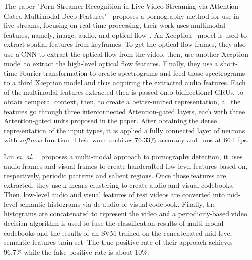 The paper "Porn Streamer Recognition in Live Video Streaming via Attention-Gated Multimodal Deep Features"~\cite{wang2019porn} proposes a pornography method for use in live streams, focusing on real-time processing, their work uses multimodal features, namely, image, audio, and optical flow~\cite{horn1981opticalflow}. 
An Xception~\cite{chollet2017xception} model is used to extract spatial features from keyframes. 
To get the optical flow frames, they also use a CNN to extract the optical flow from the video, then, use another Xception model to extract the high-level optical flow features. 
Finally, they use a short-time Fourier transformation to create spectrograms and feed those spectrograms to a third Xception model and thus acquiring the extracted audio features.  
Each of the multimodal features extracted then is passed onto bidirectional GRUs\cite{dey2017GRU}, to obtain temporal context, then, to create a better-unified representation, all the features go through three interconnected Attention-gated layers, each with three Attention-gated units proposed in the paper. After obtaining the dense representation of the input types, it is applied a fully connected layer of neurons with \textit{softmax} function. Their work archives 76.33\% accuracy and runs at 66.1 fps.

Liu \textit{et. al.} ~\cite{liu2020analyzing} proposes a multi-modal approach to pornography detection, it uses audio-frames and visual-frames to create handcrafted low-level features based on, respectively, periodic patterns and salient regions. Once those features are extracted, they use k-means clustering to create audio and visual codebooks. 
Then, low-level audio and visual features of test videos are converted into mid-level semantic histograms via de audio or visual codebook. 
Finally, the histograms are concatenated to represent the video and a periodicity-based video decision algorithm is used to fuse the classification results of multi-modal codebooks and the results of an SVM trained on the concatenated mid-level semantic features train set.
The true positive rate of their approach achieves 96.7\% while the false positive rate is about 10\%.

